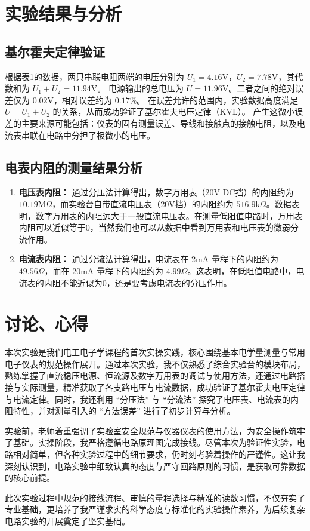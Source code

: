 \documentclass[10.5pt]{config}
\begin{document}
\section{实验结果与分析}
\subsection{基尔霍夫定律验证}
根据表1的数据，两只串联电阻两端的电压分别为 $U_1 = 4.16\mathrm{V}$，$U_2 = 7.78\mathrm{V}$，其代数和为 $U_1 + U_2 = 11.94\mathrm{V}$。
电源输出的总电压为 $U = 11.96\mathrm{V}$。二者之间的绝对误差仅为 $0.02\mathrm{V}$，相对误差约为 $0.17\%$。
在误差允许的范围内，实验数据高度满足 $U = U_1 + U_2$ 的关系，从而成功验证了基尔霍夫电压定律（KVL）。
产生这微小误差的主要来源可能包括：仪表的固有测量误差、导线和接触点的接触电阻，以及电流表串联在电路中分担了极微小的电压。

\subsection{电表内阻的测量结果分析}
\begin{enumerate}
    \item \textbf{电压表内阻：} 通过分压法计算得出，数字万用表（20V DC挡）的内阻约为 $10.19\mathrm{M}\Omega$，而实验台自带直流电压表（20V挡）的内阻约为 $516.9\mathrm{k}\Omega$。数据表明，数字万用表的内阻远大于一般直流电压表。在测量低阻值电路时，万用表内阻可以近似等于0，当然我们也可以从数据中看到万用表和电压表的微弱分流作用。
    \item \textbf{电流表内阻：} 通过分流法计算得出，电流表在 2mA 量程下的内阻约为 $49.56\Omega$，而在 20mA 量程下的内阻约为 $4.99\Omega$。这表明，在低阻值电路中，电流表的内阻不能近似为0，还是要考虑电流表的分压作用。
\end{enumerate}

\section{讨论、心得}

本次实验是我们电工电子学课程的首次实操实践，核心围绕基本电学量测量与常用电子仪表的规范操作展开。通过本次实验，我不仅熟悉了综合实验台的模块布局，熟练掌握了直流稳压电源、恒流源及数字万用表的调试与使用方法，还通过电路搭接与实际测量，精准获取了各支路电压与电流数据，成功验证了基尔霍夫电压定律与电流定律。同时，我还利用 “分压法” 与 “分流法” 探究了电压表、电流表的内阻特性，并对测量引入的 “方法误差” 进行了初步计算与分析。

实验前，老师着重强调了实验室安全规范与仪器仪表的使用方法，为安全操作筑牢了基础。实操阶段，我严格遵循电路原理图完成接线。尽管本次为验证性实验，电路相对简单，但各种实验过程中的细节要求，仍时刻考验着操作的严谨性。这让我深刻认识到，电路实验中细致认真的态度与严守回路原则的习惯，是获取可靠数据的核心前提。

此次实验过程中规范的接线流程、审慎的量程选择与精准的读数习惯，不仅夯实了专业基础，更培养了我严谨求实的科学态度与标准化的实验操作素养，为后续复杂电路实验的开展奠定了坚实基础。
\end{document}
